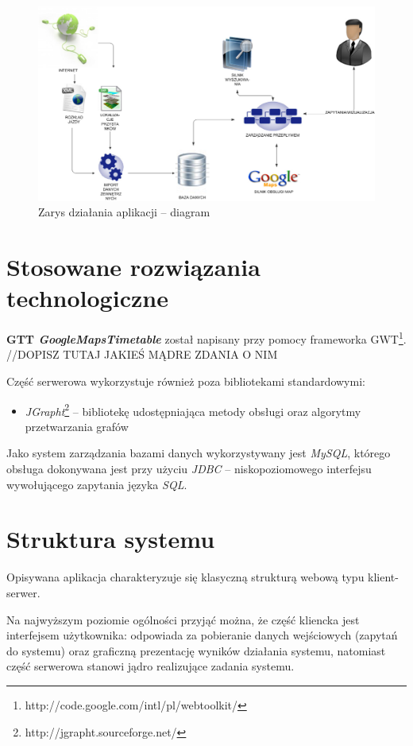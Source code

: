 \documentclass[a4paper,12pt]{article}
\begin{document}
 \begin{figure}[htp]
\centering
\includegraphics[width=\textwidth]{dzialanie_systemu} 
\caption{Zarys działania aplikacji -- diagram}\label{dzialanie_systemu}
\end{figure}

\section{Stosowane rozwiązania technologiczne}
\textbf{GTT \emph{GoogleMapsTimetable}} został napisany przy pomocy frameworka
GWT\footnote{http://code.google.com/intl/pl/webtoolkit/}. //DOPISZ TUTAJ JAKIEŚ
MĄDRE ZDANIA O NIM

Część serwerowa wykorzystuje również poza bibliotekami standardowymi:
\begin{itemize}
  \item \emph{JGrapht}\footnote{http://jgrapht.sourceforge.net/} -- bibliotekę
  udostępniająca metody obsługi oraz algorytmy przetwarzania grafów
\end{itemize}

Jako system zarządzania bazami danych wykorzystywany jest \emph{MySQL}, którego
obsługa dokonywana jest przy użyciu \emph{JDBC} -- niskopoziomowego interfejsu
wywołującego zapytania języka \emph{SQL}.

\section{Struktura systemu}

Opisywana aplikacja charakteryzuje się klasyczną strukturą webową typu
klient-serwer.

Na najwyższym poziomie ogólności przyjąć można, że część kliencka jest
interfejsem użytkownika: odpowiada za pobieranie danych wejściowych (zapytań do
systemu) oraz graficzną prezentację wyników działania systemu, natomiast część
serwerowa stanowi jądro realizujące zadania systemu.
\end{document}
